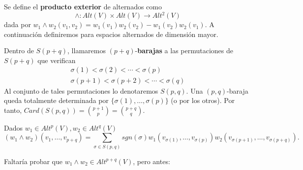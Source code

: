 \documentclass[cursovd_portada.tex]{subfiles}
\begin{document}
\begin{defi}\label{ext}
Se define el \textbf{producto exterior} de alternados como 
$$\land:Alt(V)\times Alt(V)\to Alt^2(V)$$
dada por $w_1\land w_2(v_1,v_2)=w_1(v_1)w_2(v_2)-w_1(v_2)w_2(v_1)$. A continuación definiremos para espacios alternados de dimensión mayor.
\end{defi}
\begin{defi}
Dentro de $S(p+q)$, llamaremos $(p+q)$-\textbf{barajas} a las permutaciones de $S(p+q)$ que verifican
\begin{gather*}
\sigma(1)<\sigma(2)<\cdots<\sigma(p)\\
\sigma(p+1)<\sigma(p+2)<\cdots<\sigma(q)
\end{gather*}
Al conjunto de tales permutaciones lo denotaremos $S(p,q)$. Una $(p,q)$-baraja queda totalmente determinada por $\{\sigma(1),\dots, \sigma(p)\}$ (o por los otros). Por tanto, $Card(S(p,q))=\binom{p+1}{p}=\binom{p+q}{q}$.
\end{defi}
\begin{defi}
Dados $w_1\in Alt^p(V),w_2\in Alt^q(V)$
$$
(w_1\land w_2)(v_1,\dots, v_{p+q})=\sum_{\sigma\in S(p,q)} sgn(\sigma)w_1(v_{\sigma(1)},\dots, v_{\sigma(p)})w_2(v_{\sigma(p+1)},\dots, v_{\sigma(p+q)}).$$
\end{defi}
Faltaría probar que $w_1\land w_2\in Alt^{p+q}(V)$, pero antes:
\end{document}
